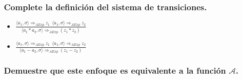 \documentclass[12pt]{report}
\begin{document}
\subsubsection{Complete la definición del sistema de transiciones.}






\begin{itemize}
\item  $\frac{\langle a_1 , \sigma \rangle \Rightarrow_{AExp} z_1 \>\> \langle a_1 , \sigma \rangle \Rightarrow_{AExp} z_2}{ \langle a_1 * a_2 , \sigma \rangle \Rightarrow_{AExp}(z_1 * z_2) }$

\item  $\frac{\langle a_1 , \sigma \rangle \Rightarrow_{AExp} z_1 \>\> \langle a_1 , \sigma \rangle \Rightarrow_{AExp} z_2}{ \langle a_1 - a_2 , \sigma \rangle \Rightarrow_{AExp}(z_1 - z_2) }$

\end{itemize}
\subsubsection{Demuestre que este enfoque es equivalente a la función $\mathcal{A}$.}
\end{document}
